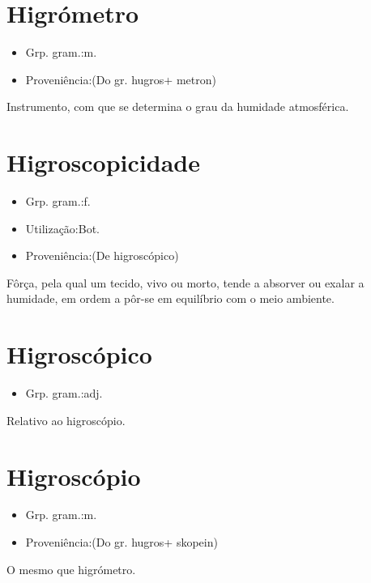 \documentclass{article}
\begin{document}
\section{Higrómetro}
\begin{itemize}
\item {Grp. gram.:m.}
\end{itemize}
\begin{itemize}
\item {Proveniência:(Do gr. \textunderscore hugros\textunderscore  + \textunderscore metron\textunderscore )}
\end{itemize}
Instrumento, com que se determina o grau da humidade atmosférica.
\section{Higroscopicidade}
\begin{itemize}
\item {Grp. gram.:f.}
\end{itemize}
\begin{itemize}
\item {Utilização:Bot.}
\end{itemize}
\begin{itemize}
\item {Proveniência:(De \textunderscore higroscópico\textunderscore )}
\end{itemize}
Fôrça, pela qual um tecido, vivo ou morto, tende a absorver ou exalar a humidade, em ordem a pôr-se em equilíbrio com o meio ambiente.
\section{Higroscópico}
\begin{itemize}
\item {Grp. gram.:adj.}
\end{itemize}
Relativo ao higroscópio.
\section{Higroscópio}
\begin{itemize}
\item {Grp. gram.:m.}
\end{itemize}
\begin{itemize}
\item {Proveniência:(Do gr. \textunderscore hugros\textunderscore  + \textunderscore skopein\textunderscore )}
\end{itemize}
O mesmo que \textunderscore higrómetro\textunderscore .
\end{document}

